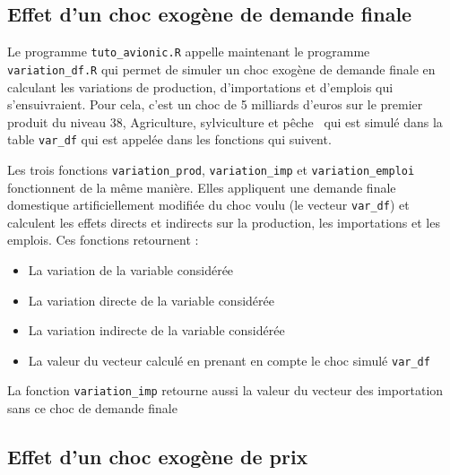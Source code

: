 \documentclass[a4paper,french,11pt]{article}
\begin{document}
\subsection{Effet d'un choc exog\`ene de demande finale}

Le programme \verb|tuto_avionic.R| appelle maintenant le programme \verb|variation_df.R| qui permet de simuler un choc exog\`ene de demande finale en calculant les variations de production, d'importations et d'emplois qui s'ensuivraient. Pour cela, c'est un choc de 5 milliards d'euros sur le premier produit du niveau 38, \og Agriculture, sylviculture et p\^eche\fg~ qui est simul\'e dans la table \verb|var_df| qui est appel\'ee dans les fonctions qui suivent.

Les trois fonctions \verb|variation_prod|, \verb|variation_imp| et \verb|variation_emploi| fonctionnent de la m\^eme mani\`ere. Elles appliquent une demande finale domestique artificiellement modifi\'ee du choc voulu (le vecteur \verb|var_df|) et calculent les effets directs et indirects sur la production, les importations et les emplois. Ces fonctions retournent :
\begin{itemize}
\item La variation de la variable consid\'er\'ee
\item La variation directe de la variable consid\'er\'ee
\item La variation indirecte de la variable consid\'er\'ee
\item La valeur du vecteur calcul\'e en prenant en compte le choc simul\'e \verb|var_df|
\end{itemize}
La fonction \verb|variation_imp| retourne aussi la valeur du vecteur des importation sans ce choc de demande finale

\subsection{Effet d'un choc exog\`ene de prix}\label{1}
\end{document}
